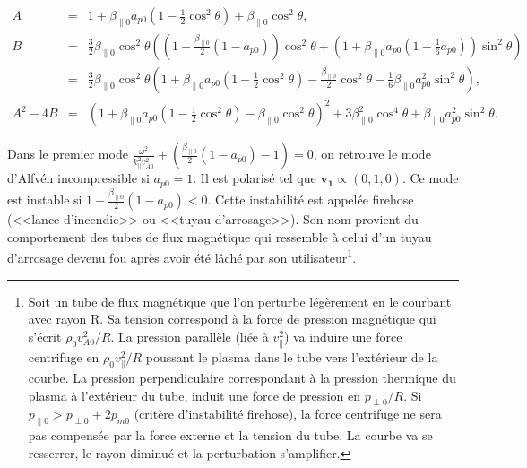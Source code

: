 \begin{eqnarray*}
    A &=& 1+ \beta_{\parallel 0}a_{p0} \left(1-\frac{1}{2}\cos^2 \theta\right)+\beta_{\parallel 0}\cos^2 \theta ,\\
    B &=& \frac{3}{2}\beta_{\parallel 0}\cos^2 \theta \left( \left( 1-\frac{\beta_{\parallel 0}}{2} \left( 1-a_{p0}\right)\right)\cos^2 \theta + \left( 1+\beta_{\parallel 0}a_{p0}\left(1-\frac{1}{6}a_{p0}\right)\right) \sin^2 \theta \right) \\
    &=&  \frac{3}{2}\beta_{\parallel 0}\cos^2 \theta \left(1+\beta_{\parallel 0} a_{p0} \left(1-\frac{1}{2}\cos^2 \theta \right)-\frac{\beta_{\parallel 0}}{2}\cos^2 \theta -\frac{1}{6} \beta_{\parallel 0}a^2_{p0}\sin^2 \theta \right) ,\\
    A^2-4B &=& \left(1+ \beta_{\parallel 0}a_{p0} \left(1-\frac{1}{2}\cos^2 \theta\right)-\beta_{\parallel 0}\cos^2 \theta\right)^2 + 3 \beta^2_{\parallel 0}\cos^4 \theta + \beta_{\parallel 0}a^2_{p0}\sin^2 \theta.
\end{eqnarray*}

Dans le premier mode $\frac{\omega^2}{k^2_{\parallel} v^2_{A0}} +   \left(\frac{\beta_{\parallel 0}}{2} \left(1-a_{p0}\right)-1\right)=0$, on retrouve le mode d'Alfvén incompressible si $a_{p0} = 1$. Il est polarisé tel que $\boldsymbol{v_1} \propto \left(0,1,0\right) $. Ce mode est instable si $ 1 -  \frac{\beta_{\parallel 0}}{2} \left(1-a_{p0}\right)<0$. Cette instabilité est appelée firehose (<<lance d'incendie>> ou <<tuyau d'arrosage>>). Son nom provient du comportement des tubes de flux magnétique qui ressemble à celui d'un tuyau d'arrosage devenu fou après avoir été lâché par son utilisateur\footnote{Soit un tube de flux magnétique que l'on perturbe légèrement en le courbant avec rayon R. Sa tension correspond à la force de pression magnétique qui s'écrit $\rho_0 v^2_{A0}/R$. La pression parallèle (liée à $v^2_{\parallel}$) va induire une force centrifuge en $\rho_0 v^2_{\parallel}/R$ poussant le plasma dans le tube vers l'extérieur de la courbe. La pression perpendiculaire correspondant à la pression thermique du plasma à l'extérieur du tube, induit une force de pression en $p_{\perp 0}/R$. Si $p_{\parallel 0} > p_{\perp 0} + 2 p_{m0} $ (critère d'instabilité firehose), la force centrifuge ne sera pas compensée par la force externe et la tension du tube. La courbe va se resserrer, le rayon diminué et la perturbation s'amplifier.}.


